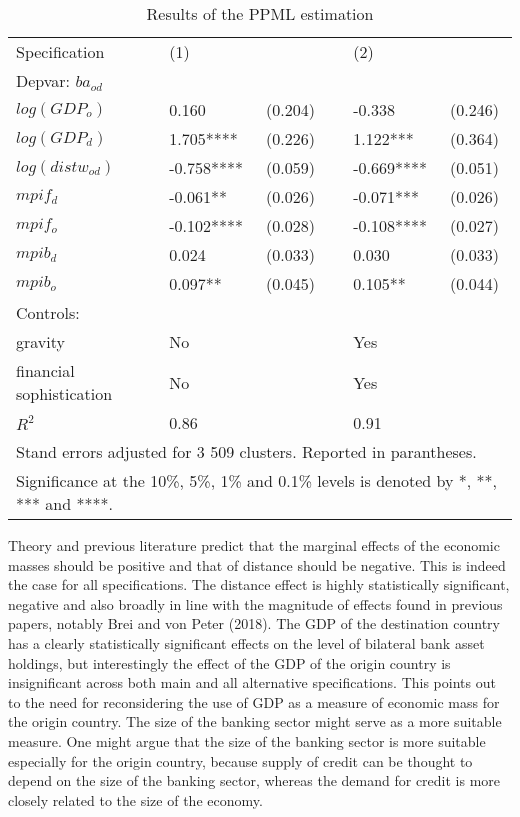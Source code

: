 \documentclass[12pt,a4paper]{article}
\begin{document}
\begin{table}[!h]
\centering
\begin{tabular}{ l l l l l l}
\hline
Specification&(1)&&&(2)& \\
Depvar: $ba_{od}$&&&&&\\
\hline
$log(GDP_{o})$&0.160&(0.204)&&-0.338&(0.246)\\
$log(GDP_{d})$&1.705****&(0.226)&&1.122***&(0.364)\\
$log(distw_{od})$&-0.758****&(0.059)&&-0.669****&(0.051)\\
$mpif_{d}$&-0.061**&(0.026)&&-0.071***&(0.026)\\
$mpif_{o}$&-0.102****&(0.028)&&-0.108****&(0.027)\\
$mpib_{d}$&0.024&(0.033)&&0.030&(0.033)\\
$mpib_{o}$&0.097**&(0.045)&&0.105**&(0.044)\\
Controls:&&&&&\\
gravity &No&&&Yes& \\ 
financial sophistication &No&&&Yes& \\
\hline
$R^2$&0.86&&&0.91&\\
\hline
\multicolumn{6}{l}{Stand errors adjusted for 3 509 clusters. Reported in parantheses. }\\
\hline
\multicolumn{6}{l}{\footnotesize Significance at the 10\%, 5\%, 1\% and 0.1\% levels is denoted by *, **, *** and ****.}\\
\end{tabular}
\caption{Results of the PPML estimation}
\label{tab:results}
\end{table}

Theory and previous literature predict that the marginal effects of the economic masses should be positive and that of distance should be negative. This is indeed the case for all specifications. The distance effect is highly statistically significant, negative and also broadly in line with the magnitude of effects found in previous papers, notably Brei and von Peter (2018). The GDP of the destination country has a clearly statistically significant effects on the level of bilateral bank asset holdings, but interestingly the effect of the GDP of the origin country is insignificant across both main and all alternative specifications. This points out to the need for reconsidering the use of GDP as a measure of economic mass for the origin country. The size of the banking sector might serve as a more suitable measure. One might argue that the size of the banking sector is more suitable especially for the origin country, because supply of credit can be thought to depend on the size of the banking sector, whereas the demand for credit is more closely related to the size of the economy. 
\end{document}
